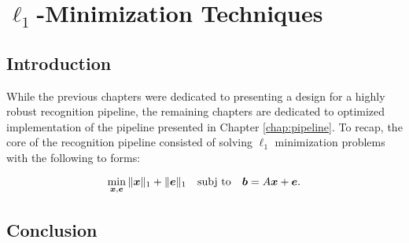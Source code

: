 \chapter{$\ell_1$-Minimization Techniques}
\label{chap:minimization}

\section{Introduction}
While the previous chapters were dedicated to presenting a design for a highly robust
recognition pipeline, the remaining chapters are dedicated to optimized implementation
of the pipeline presented in Chapter \ref{chap:pipeline}.  To recap, the core of the recognition
pipeline consisted of solving $\ell_1$ minimization problems with the following to forms:

\begin{equation}
\min_{{\boldsymbol{x}}, {\boldsymbol{e}}} \| {\boldsymbol{x}} \|_1 + \|{\boldsymbol{e}}\|_1 \quad \textup{subj to} \quad \boldsymbol{b} = A {\boldsymbol{x}} + {\boldsymbol{e}}.
\label{eqn:l1min_denoise}
\end{equation}





%
%

\section{Conclusion}


